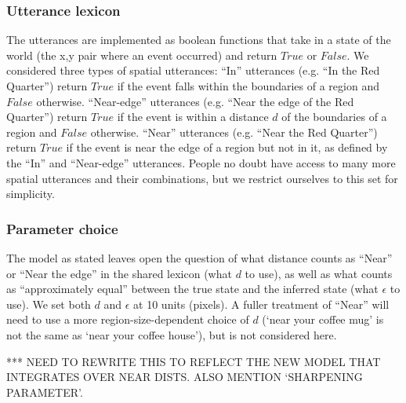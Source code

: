 \documentclass[10pt,letterpaper]{article}
\begin{document}
\subsubsection{Utterance lexicon} The utterances are implemented as boolean functions that take in a state of the world (the x,y pair where an event occurred) and return $True$ or $False$. We considered three types of spatial utterances: ``In'' utterances (e.g. ``In the Red Quarter'') return $True$ if the event falls within the boundaries of a region and $False$ otherwise. ``Near-edge'' utterances (e.g. ``Near the edge of the Red Quarter'') return $True$ if the event is within a distance $d$ of the boundaries of a region and $False$ otherwise. ``Near'' utterances (e.g. ``Near the Red Quarter'') return $True$ if the event is near the edge of a region but not in it, as defined by the ``In'' and ``Near-edge'' utterances. People no doubt have access to many more spatial utterances and their combinations, but we restrict ourselves to this set for simplicity. 

\subsubsection{Parameter choice} The model as stated leaves open the question of what distance counts as ``Near'' or ``Near the edge'' in the shared lexicon (what $d$ to use), as well as what counts as ``approximately equal'' between the true state and the inferred state (what $\epsilon$ to use). We set both $d$ and $\epsilon$ at 10 units (pixels). A fuller treatment of ``Near'' will need to use a more region-size-dependent choice of $d$ (`near your coffee mug' is not the same as `near your coffee house'), but is not considered here. 

*** NEED TO REWRITE THIS TO REFLECT THE NEW MODEL THAT INTEGRATES OVER NEAR DISTS. ALSO MENTION `SHARPENING PARAMETER'.
\end{document}
